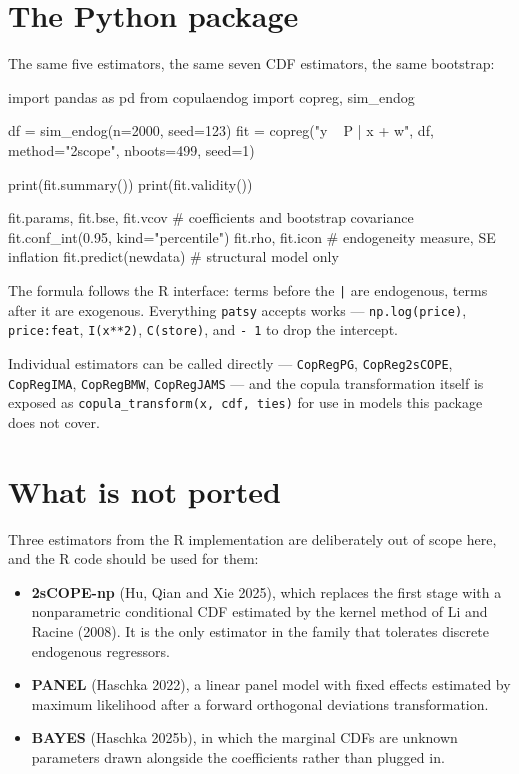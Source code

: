 \documentclass[11pt]{article}
\begin{document}
\section{The Python package}

The same five estimators, the same seven CDF estimators, the same bootstrap:

\begin{stata}
import pandas as pd
from copulaendog import copreg, sim_endog

df  = sim_endog(n=2000, seed=123)
fit = copreg("y ~ P | x + w", df, method="2scope", nboots=499, seed=1)

print(fit.summary())
print(fit.validity())

fit.params, fit.bse, fit.vcov      # coefficients and bootstrap covariance
fit.conf_int(0.95, kind="percentile")
fit.rho, fit.icon                  # endogeneity measure, SE inflation
fit.predict(newdata)               # structural model only
\end{stata}

The formula follows the R interface: terms before the \verb=|= are endogenous,
terms after it are exogenous. Everything \texttt{patsy} accepts works ---
\verb=np.log(price)=, \verb=price:feat=, \verb=I(x**2)=, \verb=C(store)=, and
\verb=- 1= to drop the intercept.

Individual estimators can be called directly --- \texttt{CopRegPG},
\texttt{CopReg2sCOPE}, \texttt{CopRegIMA}, \texttt{CopRegBMW},
\texttt{CopRegJAMS} --- and the copula transformation itself is exposed as
\texttt{copula\_transform(x, cdf, ties)} for use in models this package does
not cover.

\section{What is not ported}

Three estimators from the R implementation are deliberately out of scope here,
and the R code should be used for them:

\begin{itemize}[leftmargin=1.4em,itemsep=0.2em]
\item \textbf{2sCOPE-np} (Hu, Qian and Xie 2025), which replaces the first
      stage with a nonparametric conditional CDF estimated by the kernel
      method of Li and Racine (2008). It is the only estimator in the family
      that tolerates discrete endogenous regressors.
\item \textbf{PANEL} (Haschka 2022), a linear panel model with fixed effects
      estimated by maximum likelihood after a forward orthogonal deviations
      transformation.
\item \textbf{BAYES} (Haschka 2025b), in which the marginal CDFs are unknown
      parameters drawn alongside the coefficients rather than plugged in.
\end{itemize}
\end{document}
